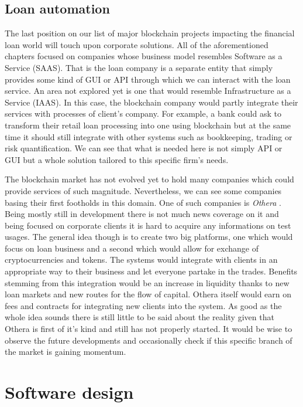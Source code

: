 \documentclass[a4paper,12pt,twoside,openany]{report}
\begin{document}
\section{Loan automation}

The last position on our list of major blockchain projects impacting the financial loan world will touch upon corporate solutions. All of the aforementioned chapters focused on companies whose business model resembles Software as a Service (SAAS). That is the loan company is a separate entity that simply provides some kind of GUI or API through which we can interact with the loan service. An area not explored yet is one that would resemble Infrastructure as a Service (IAAS). In this case, the blockchain company would partly integrate their services with processes of client's company. For example, a bank could ask to transform their retail loan processing into one using blockchain but at the same time it should still integrate with other systems such as bookkeeping, trading or risk quantification. We can see that what is needed here is not simply API or GUI but a whole solution tailored to this specific firm's needs.

The blockchain market has not evolved yet to hold many companies which could provide services of such magnitude. Nevertheless, we can see some companies basing their first footholds in this domain. One of such companies is \textit{Othera} \cite{othera}.  Being mostly still in development there is not much news coverage on it and being focused on corporate clients it is hard to acquire any informations on test usages. The general idea though is to create two big platforms, one which would focus on loan business and a second which would allow for exchange of cryptocurrencies and tokens. The systems would integrate with clients in an appropriate way to their business and let everyone partake in the trades. Benefits stemming from this integration would be an increase in liquidity thanks to new loan markets and new routes for the flow of capital. Othera itself would earn on fees and contracts for integrating new clients into the system. As good as the whole idea sounds there is still little to be said about the reality given that Othera is first of it's kind and still has not properly started. It would be wise to observe the future developments and occasionally check if this specific branch of the market is gaining momentum.

\chapter{Software design}
\end{document}
